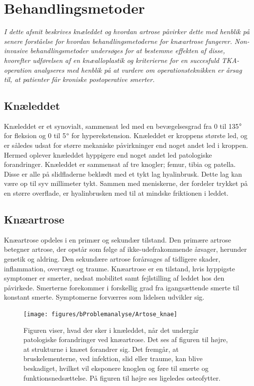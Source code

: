 \section{Behandlingsmetoder}
\textit{I dette afsnit beskrives knæleddet og hvordan artrose påvirker dette med henblik på senere forståelse for hvordan behandlingsmetoderne for knæartrose fungerer. Non-invasive behandlingsmetoder undersøges for at bestemme effekten af disse, hvorefter udførelsen af en knæalloplastik og kriterierne for en succesfuld TKA-operation analyseres med henblik på at vurdere om operationsteknikken er årsag til, at patienter får kroniske postoperative smerter.}

\subsection{Knæleddet}
Knæleddet er et synovialt, sammensat led med en bevægelsesgrad fra 0 til 135$\degree$ for fleksion og 0 til 5$\degree$ for hyperekstension. Knæleddet er kroppens største led, og er således udsat for større mekaniske påvirkninger end noget andet led i kroppen. Hermed oplever knæleddet hyppigere end noget andet led patologiske forandringer. Knæleddet er sammensat af tre knogler; femur, tibia og patella. Disse er alle på slidfladerne beklædt med et tykt lag hyalinbrusk. Dette lag kan være op til syv millimeter tykt. Sammen med meniskerne, der fordeler trykket på en større overflade, er hyalinbrusken med til at mindske friktionen i leddet. \citep{Moeller2001}

\subsection{Knæartrose}
Knæartrose opdeles i en primær og sekundær tilstand. Den primære artrose betegner artrose, der opstår som følge af ikke-udefrakommende årsager, herunder genetik og aldring. Den sekundære artrose forårsages af tidligere skader, inflammation, overvægt og traume. Knæartrose er en tilstand, hvis hyppigste symptomer er smerter, nedsat mobilitet samt fejlstilling af leddet hos den påvirkede. Smerterne forekommer i forskellig grad fra igangsættende smerte til konstant smerte. Symptomerne forværres som lidelsen udvikler sig. \citep{Lind2016b}

\begin{figure}[H] 
\begin{center}
\texttt{[image: figures/bProblemanalyse/Artose\_knae]}
\end{center}
\caption{Figuren viser, hvad der sker i knæleddet, når det undergår patologiske forandringer ved knæartrose. Det ses af figuren til højre, at strukturne i knæet forandrer sig. Det fremgår, at bruskelementerne, ved infektion, slid eller traume, kan blive beskadiget, hvilket vil eksponere knoglen og føre til smerte og funktionsnedsættelse. På figuren til højre ses ligeledes osteofytter. \citep{schroder} \citep{adobe}} 
\label{fig:tka_implant} 
\end{figure}

